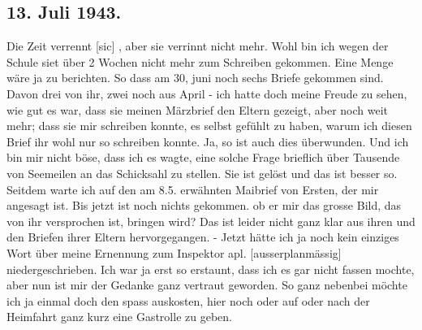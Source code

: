 \subsection{13. Juli 1943.}

Die Zeit verrennt{\color{red} [sic] }, aber sie verrinnt nicht mehr.
Wohl bin ich wegen der Schule siet \"{u}ber 2 Wochen nicht mehr zum Schreiben gekommen.
Eine Menge w\"{a}re ja zu berichten.
So dass am 30, juni noch sechs Briefe gekommen sind.
Davon drei von ihr, zwei noch aus April - ich hatte doch meine Freude zu sehen, wie gut es war, dass sie meinen M\"{a}rzbrief den Eltern gezeigt, aber noch weit mehr; dass sie mir schreiben konnte, es selbst gef\"{u}hlt zu haben, warum ich diesen Brief ihr wohl nur so schreiben konnte.
Ja, so ist auch dies \"{u}berwunden.
Und ich bin mir nicht b\"{o}se, dass ich es wagte, eine solche Frage brieflich \"{u}ber Tausende von Seemeilen an das Schicksahl zu stellen.
Sie ist gel\"{o}st und das ist besser so.
Seitdem warte ich auf den am 8.5. erw\"{a}hnten Maibrief von Ersten, der mir angesagt ist.
Bis jetzt ist noch nichts gekommen.
ob er mir das grosse Bild, das von ihr versprochen ist, bringen wird?
Das ist leider nicht ganz klar aus ihren und den Briefen ihrer Eltern hervorgegangen.
- Jetzt h\"{a}tte ich ja noch kein einziges Wort \"{u}ber meine Ernennung zum Inspektor apl. {\color{red} [ausserplanm\"{a}ssig] } niedergeschrieben.
Ich war ja erst so erstaunt, dass ich es gar nicht fassen mochte, aber nun ist mir der Gedanke ganz vertraut geworden.
So ganz nebenbei m\"{o}chte ich ja einmal doch den spass auskosten, hier noch oder auf oder nach der Heimfahrt ganz kurz eine Gastrolle zu geben.

\clearpage
